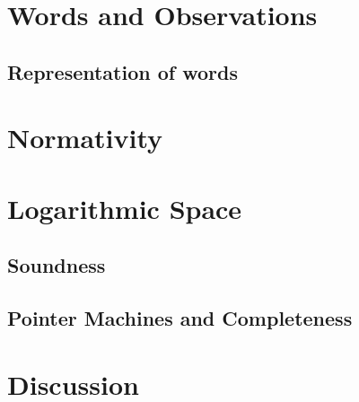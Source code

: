 \section{Words and Observations}\label{sec_words}
	\subsection{Representation of words}
	
	
	
\section{Normativity}\label{sec_normativity}
	

\section{Logarithmic Space}\label{sec_logspace}
	\subsection{Soundness}
	
	\subsection{Pointer Machines and Completeness}
	

\section{Discussion}




